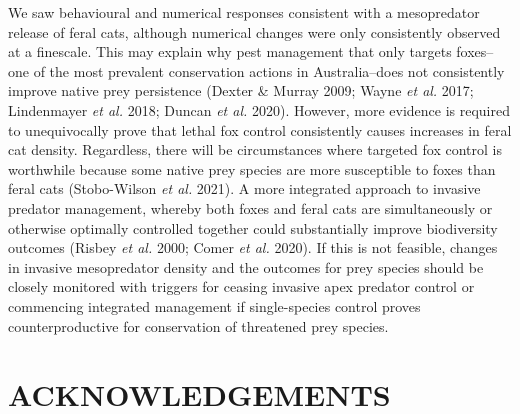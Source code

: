 \documentclass[]{elsarticle} %
\begin{document}
We saw behavioural and numerical responses consistent with a mesopredator release of feral cats, although numerical changes were only consistently observed at a finescale. This may explain why pest management that only targets foxes--one of the most prevalent conservation actions in Australia--does not consistently improve native prey persistence (Dexter \& Murray 2009; Wayne \emph{et al.} 2017; Lindenmayer \emph{et al.} 2018; Duncan \emph{et al.} 2020). However, more evidence is required to unequivocally prove that lethal fox control consistently causes increases in feral cat density. Regardless, there will be circumstances where targeted fox control is worthwhile because some native prey species are more susceptible to foxes than feral cats (Stobo-Wilson \emph{et al.} 2021). A more integrated approach to invasive predator management, whereby both foxes and feral cats are simultaneously or otherwise optimally controlled together could substantially improve biodiversity outcomes (Risbey \emph{et al.} 2000; Comer \emph{et al.} 2020). If this is not feasible, changes in invasive mesopredator density and the outcomes for prey species should be closely monitored with triggers for ceasing invasive apex predator control or commencing integrated management if single-species control proves counterproductive for conservation of threatened prey species.

\newpage

\hypertarget{acknowledgements}{%
\section{ACKNOWLEDGEMENTS}\label{acknowledgements}}
\end{document}
